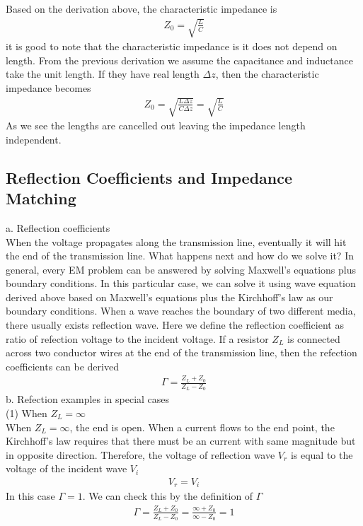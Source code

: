 \documentclass[a4paper]{article}
\begin{document}
Based on the derivation above, the characteristic impedance is 
\begin{align*}
	Z_0 = \sqrt{\frac{L}{C}}
\end{align*}
it is good to note that the characteristic impedance is it does not depend on length. From the previous derivation we assume the capacitance and inductance take the unit length. If they have real length  $\Delta z$, then the characteristic impedance becomes
\begin{align*}
	Z_0 = \sqrt{\frac{L \Delta z}{C \Delta z}} = \sqrt{\frac{L}{C}}
\end{align*}
As we see the lengths are cancelled out leaving the impedance length independent.
\subsection{Reflection Coefficients and Impedance Matching}
{a. Reflection coefficients}\\
When the voltage propagates along the transmission line, eventually it will hit the end of the transmission line. What happens next and how do we solve it? In general, every EM problem can be answered by solving Maxwell's equations plus boundary conditions. In this particular case, we can solve it using wave equation derived above based on Maxwell's equations plus the Kirchhoff's law as our boundary conditions. When a wave reaches the boundary of two different media, there usually exists reflection wave. Here we define the reflection coefficient as ratio of refection voltage to the incident voltage. If a resistor $Z_L$ is connected across two conductor wires at the end of the transmission line, then the refection coefficients can be derived
\begin{align*}
	\Gamma = \frac{Z_L + Z_0}{Z_L - Z_0}
\end{align*}
{b. Refection examples in special cases}\\
(1) When $Z_L = \infty$\\
When $Z_L = \infty$, the end is open. When a current flows to the end point, the Kirchhoff's law requires that there must be an current with same magnitude but in opposite direction. Therefore, the voltage of reflection wave $V_r$ is equal to the voltage of the incident wave $V_i$
\begin{align*}
	V_r = V_i
\end{align*}
In this case $\Gamma = 1$. We can check this by the definition of $\Gamma$
\begin{align*}
	\Gamma = \frac{Z_L + Z_0}{Z_L - Z_0} = \frac{\infty + Z_0}{\infty - Z_0} = 1
\end{align*}
\end{document}
